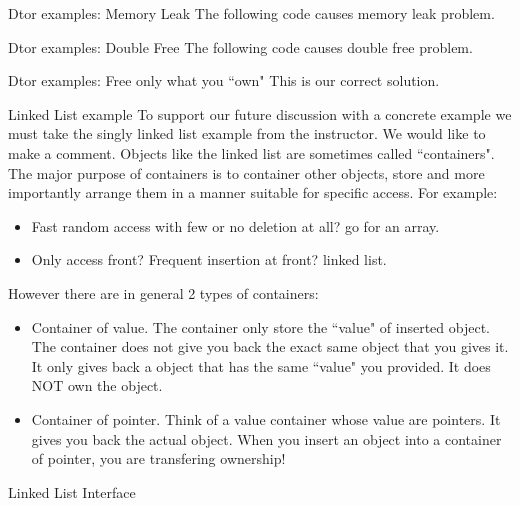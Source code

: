 \begin{frame}[fragile]{Dtor examples: Memory Leak}
The following code causes memory leak problem.
\end{frame}

\begin{frame}[fragile]{Dtor examples: Double Free}
The following code causes double free problem.
\end{frame}

\begin{frame}[fragile]{Dtor examples: Free only what you ``own"}
This is our correct solution.
\end{frame}

\begin{frame}[fragile]{Linked List example}
\small
To support our future discussion with a concrete example we must take the singly linked list example from the instructor.
We would like to make a comment. Objects like the linked list are sometimes called ``containers". The major purpose of containers is to container other objects, store and more importantly arrange them in a manner suitable for specific access. For example:
\begin{itemize}
	\item Fast random access with few or no deletion at all? go for an array.
	\item Only access front? Frequent insertion at front? linked list.
\end{itemize}
However there are in general 2 types of containers:
\begin{itemize}
	\item Container of value. The container only store the ``value" of inserted object. The container does not give you back the exact same object that you gives it. It only gives back a object that has the same ``value" you provided. It does NOT own the object.
	\item Container of pointer. Think of a value container whose value are pointers. It gives you back the actual object. \alert{When you insert an object into a container of pointer, you are transfering ownership!}
\end{itemize}
\end{frame}

\begin{frame}[fragile]{Linked List Interface}
\inputminted[fontsize=\small]{c++}{code/Linked-List/IntList.h}
\end{frame}

